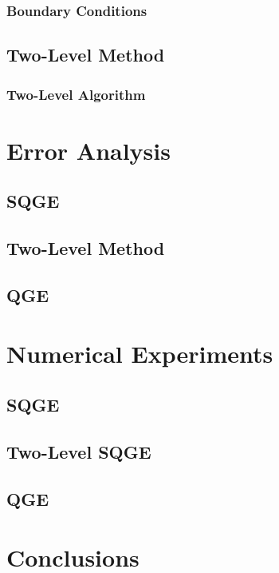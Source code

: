 \documentclass[12pt]{VTthesis}
\begin{document}
      \subsection{Boundary Conditions} \label{sse:BCs}
      
    \section{Two-Level Method} \label{sec:TwoLevel}
    
      \subsection{Two-Level Algorithm} \label{sse:Algorithm}
      

  \chapter{Error Analysis} \label{ch:Errors}
  
    \section{SQGE} \label{sec:SQGEErrors}
    
    \section{Two-Level Method} \label{sse:SQGE2LE}
    
    \section{QGE} \label{sec:QGEError}
    

  \chapter{Numerical Experiments} \label{ch:Tests}
  
    \section{SQGE} \label{sec:SQGETests}
    
    \section{Two-Level SQGE} \label{sec:SQGE2LTests}
    
    \section{QGE} \label{sec:QGETests}
    

  \chapter{Conclusions} \label{ch:Conclusions}
  

  
  

%  
\end{document}
